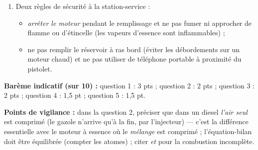 \documentclass[11pt]{article}
\begin{document}
\begin{corrige}
\begin{enumerate}
\item Deux règles de sécurité à la station-service :
\begin{itemize}
\item \emph{arrêter le moteur} pendant le remplissage et ne pas fumer ni approcher de flamme ou d'étincelle (les vapeurs d'essence sont inflammables) ;
\item ne pas remplir le réservoir à ras bord (éviter les débordements sur un moteur chaud) et ne pas utiliser de téléphone portable à proximité du pistolet.
\end{itemize}
\end{enumerate}
\textbf{Barème indicatif (sur 10) :} question 1 : 3 pts ; question 2 : 2 pts ; question 3 : 2 pts ; question 4 : 1,5 pt ; question 5 : 1,5 pt.

\textbf{Points de vigilance :} dans la question 2, préciser que dans un diesel \emph{l'air seul} est comprimé (le gazole n'arrive qu'à la fin, par l'injecteur) — c'est la différence essentielle avec le moteur à essence où le \emph{mélange} est comprimé ; l'équation-bilan doit être équilibrée (compter les atomes) ; citer  \emph{et}  pour la combustion incomplète.
\end{corrige}
\end{document}
